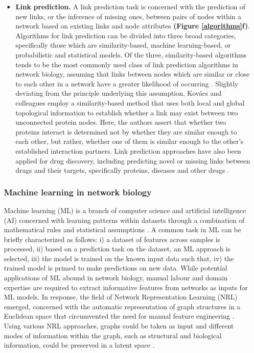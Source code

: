 \begin{itemize}
    \item \textbf{Link prediction.} A link prediction task is concerned with the prediction of new links, or the inference of missing ones, between pairs of nodes within a network based on existing links and node attributes \parencite{lu2011} \textbf{(Figure \ref{algorithms}f)}. Algorithms for link prediction can be divided into three broad categories, specifically those which are similarity-based, machine learning-based, or probabilistic and statistical models. Of the three, similarity-based algorithms tends to be the most commonly used class of link prediction algorithms in network biology, assuming that links between nodes which are similar or close to each other in a network have a greater likelihood of occurring \parencite{liu2020}. Slightly deviating from the principle underlying this assumption, Kovács and colleagues \parencite{kovacs2019} employ a similarity-based method that uses both local and global topological information to establish whether a link may exist between two unconnected protein nodes. Here, the authors assert that whether two proteins interact is determined not by whether they are similar enough to each other, but rather, whether one of them is similar enough to the other's established interaction partners. Link prediction approaches have also been applied for drug discovery, including predicting novel or missing links between drugs and their targets, specifically proteins, diseases and other drugs \parencite{abbas2021}.
\end{itemize}
    
\subsubsection{Machine learning in network biology}
Machine learning (ML) is a branch of computer science and artificial intelligence (AI) concerned with learning patterns within datasets through a combination of mathematical rules and statistical assumptions \parencite{camacho2018}. A common task in ML can be briefly characterized as follows: i) a dataset of features across samples is processed, ii) based on a prediction task on the dataset, an ML approach is selected, iii) the model is trained on the known input data such that, iv) the trained model is primed to make predictions on new data. While potential applications of ML abound in network biology, manual labour and domain expertise are required to extract informative features from networks as inputs for ML models. In response, the field of Network Representation Learning (NRL) emerged, concerned with the automatic representation of graph structures in a Euclidean space that circumvented the need for manual feature engineering \parencite{hamilton2017}. Using various NRL approaches, graphs could be taken as input and different modes of information within the graph, such as structural and biological information, could be preserved in a latent space \parencite{cai2018}. 

